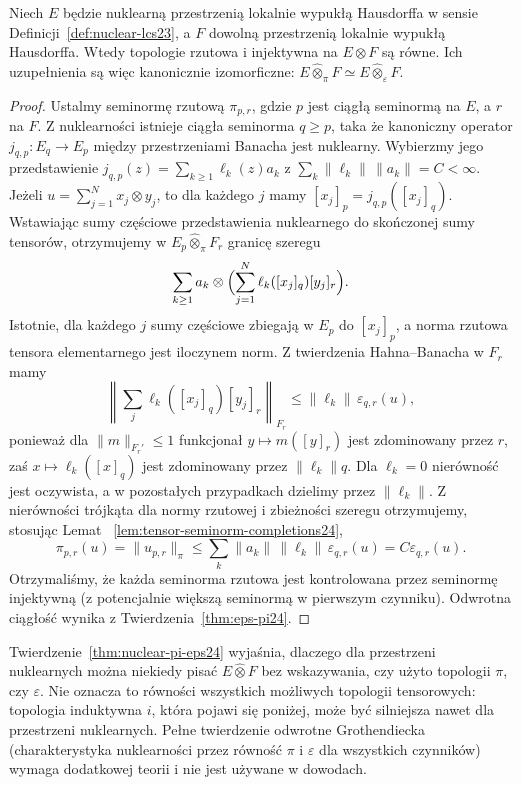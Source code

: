 \begin{twierdzenie}
\label{thm:nuclear-pi-eps24}
Niech $E$ będzie nuklearną przestrzenią lokalnie wypukłą
Hausdorffa w sensie Definicji~\ref{def:nuclear-lcs23},
a $F$ dowolną przestrzenią lokalnie wypukłą Hausdorffa.
Wtedy topologie rzutowa i injektywna na
$E\otimes F$ są równe. Ich uzupełnienia są więc
kanonicznie izomorficzne:
$E\widehat\otimes_\pi F\simeq E\widehat\otimes_\varepsilon F$.
\end{twierdzenie}
\begin{proof}
Ustalmy seminormę rzutową $\pi_{p,r}$, gdzie $p$ jest
ciągłą seminormą na $E$, a $r$ na $F$. Z nuklearności
istnieje ciągła seminorma $q\ge p$, taka że kanoniczny
operator $j_{q,p}:E_q\to E_p$ między przestrzeniami
Banacha jest nuklearny. Wybierzmy jego przedstawienie
$j_{q,p}(z)=\sum_{k\ge1}\ell_k(z)a_k$ z
$\sum_k\|\ell_k\|\,\|a_k\|=C<\infty$.
Jeżeli $u=\sum_{j=1}^N x_j\otimes y_j$, to dla każdego
$j$ mamy $[x_j]_p=j_{q,p}([x_j]_q)$.
Wstawiając sumy częściowe przedstawienia nuklearnego
do skończonej sumy tensorów, otrzymujemy w
$E_p\widehat\otimes_\pi F_r$ granicę szeregu
\[
 \sum_{k\ge1}a_k\otimes
 \Bigl(\sum_{j=1}^N\ell_k([x_j]_q)[y_j]_r\Bigr).
\]
Istotnie, dla każdego $j$ sumy częściowe zbiegają
w $E_p$ do $[x_j]_p$, a norma rzutowa tensora
elementarnego jest iloczynem norm.
Z twierdzenia Hahna--Banacha w $F_r$ mamy
\[
 \left\|\sum_j\ell_k([x_j]_q)[y_j]_r\right\|_{F_r}
 \le\|\ell_k\|\,\varepsilon_{q,r}(u),
\]
ponieważ dla $\|m\|_{F_r'}\le1$ funkcjonał
$y\mapsto m([y]_r)$ jest zdominowany przez $r$,
zaś $x\mapsto\ell_k([x]_q)$ jest zdominowany przez
$\|\ell_k\|q$. Dla $\ell_k=0$ nierówność jest oczywista,
a w pozostałych przypadkach dzielimy przez $\|\ell_k\|$.
Z nierówności trójkąta dla normy rzutowej i zbieżności
szeregu otrzymujemy, stosując Lemat~
\ref{lem:tensor-seminorm-completions24},
\[
 \pi_{p,r}(u)=\|u_{p,r}\|_\pi
 \le\sum_k\|a_k\|\,\|\ell_k\|\,\varepsilon_{q,r}(u)
 =C\varepsilon_{q,r}(u).
\]
Otrzymaliśmy, że każda seminorma rzutowa jest
kontrolowana przez seminormę injektywną (z potencjalnie
większą seminormą w pierwszym czynniku). Odwrotna
ciągłość wynika z Twierdzenia~\ref{thm:eps-pi24}.
\end{proof}

\begin{uwaga}
\label{rem:nuclear-characterization24}
Twierdzenie~\ref{thm:nuclear-pi-eps24} wyjaśnia,
dlaczego dla przestrzeni nuklearnych można niekiedy
pisać $E\widehat\otimes F$ bez wskazywania, czy
użyto topologii $\pi$, czy $\varepsilon$.
Nie oznacza to równości wszystkich możliwych topologii
tensorowych: topologia induktywna $i$, która pojawi się
poniżej, może być silniejsza nawet dla przestrzeni nuklearnych.
Pełne twierdzenie odwrotne Grothendiecka (charakterystyka
nuklearności przez równość $\pi$ i $\varepsilon$ dla wszystkich
czynników) wymaga dodatkowej teorii i nie jest używane w dowodach.
\end{uwaga}

